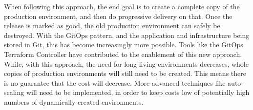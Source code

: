 When following this approach, the end goal is to create a complete copy of the production environment,
and then do progressive delivery on that.
Once the release is marked as good, the old production environment can safely be destroyed.
With the GitOps pattern, and the application and infrastructure being stored in Git,
this has become increasingly more possible.
Tools like the GitOps Terraform Controller have contributed to the enablement of this new approach. 
While, with this approach, the need for long-living environments decreases,
whole copies of production environments will still need to be created.
This means there is no guarantee that the cost will decrease.
More advanced techniques like auto-scaling will need to be implemented, in order to
keep costs low of potentially high numbers of dynamically created environments.





































